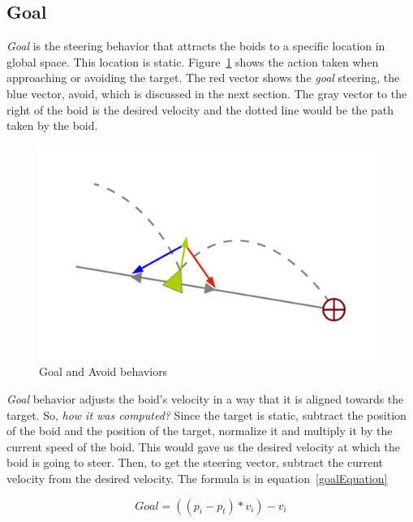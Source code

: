 \subsection{Goal}
\textit{Goal} is the steering behavior that attracts the boids to a specific location in global space. This location is static. Figure~\ref{seekfleePDF} shows the action taken when approaching or avoiding the target. The red vector shows the \textit{goal} steering, the blue vector, avoid, which is discussed in the next section. The gray vector to the right of the boid is the desired velocity and the dotted line would be the path taken by the boid.

\begin{figure}[htbp]
\begin{center}
\includegraphics[scale=0.5]{figures/seekANDflee.pdf}
\caption{Goal and Avoid behaviors}
\label{seekfleePDF}
\end{center}
\end{figure}

\textit{Goal} behavior adjusts the boid's velocity in a way that it is aligned towards the target. So, \textit{how it was computed?} Since the target is static, subtract the position of the boid and the position of the target, normalize it and multiply it by the current speed of the boid. This would gave us the desired velocity at which the boid is going to steer. Then, to get the steering vector, subtract the current velocity from the desired velocity. The formula is in equation~\ref{goalEquation}

\begin{equation}
\label{goalEquation}
Goal = ((p_i - p_t) * v_i) - v_i
\end{equation}

